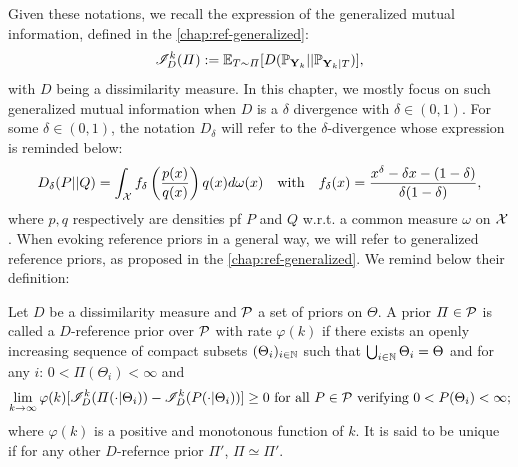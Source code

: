 Given these notations, we recall the expression of the generalized mutual information, defined in the \cref{chap:ref-generalized}:
\begin{equation}
    \mathscr{I}_D^k(\varPi) := \mathbb{E}_{T\sim\varPi}[D(\mathbb{P}_{\mathbf{Y}_k}||\mathbb{P}_{\mathbf{Y}_k|T} )],
\end{equation}
with $D$ being a dissimilarity measure.
In this chapter, we mostly focus on such generalized mutual information when $D$ is a $\delta$ divergence with $\delta\in(0,1)$. For some $\delta\in(0,1)$, the notation $D_\delta$ will refer to the $\delta$-divergence whose expression is reminded below:
    \begin{equation}
        D_\delta(P||Q) = \int_{\mathcal{X}} f_\delta\left( \frac{p(x)}{q(x)}  \right) q(x) d\omega(x)\quad \text{with}\quad f_\delta(x) = \frac{x^\delta-\delta x-(1-\delta)}{\delta(1-\delta)},
    \end{equation}
where $p,q$ respectively are densities pf $P$ and $Q$ w.r.t. a common measure $\omega$ on $\mathcal{X}$.
When evoking reference priors in a general way, we will refer to generalized reference priors, as proposed in the \cref{chap:ref-generalized}.
We remind below their definition:
\begin{defi}\label{def:BA:genref}
    Let $D$ be a dissimilarity measure and $\mathcal{P}$ a set of priors on $\Theta$. A prior $\varPi\in\mathcal{P}$ is called a $D$-reference prior over $\mathcal{P}$ with rate $\varphi(k)$ if there exists an openly increasing  sequence of compact subsets $(\Theta_i)_{i\in\mathbb{N}}$
    such that $\bigcup_{i\in\mathbb{N}}\Theta_i=\Theta$ and for any $i$: $0<\varPi(\Theta_i)<\infty $ and
        \begin{equation} %
            \lim_{k\rightarrow\infty}\varphi(k)[\sI^k_D(\varPi(\cdot|\Theta_i))-\sI^k_D(P(\cdot|\Theta_i))] \geq0 \text{\ for all\ } P\in\cP\text{\ verifying\ }0<P(\Theta_i)<\infty;
        \end{equation}
    where  $\varphi(k)$ is a {positive and}  monotonous function of $k$. It is said to be unique if for any other $D$-refernce prior $\varPi'$, $\varPi\simeq\varPi'$.
\end{defi}


